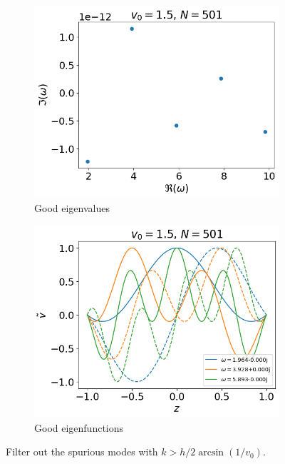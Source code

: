 \begin{figure}[H]
	\centering
	\begin{subfigure}[b]{0.5\linewidth}
		\includegraphics[width=\linewidth]{figures/eigvals-good}
		\caption{Good eigenvalues}
	\end{subfigure}%
	\begin{subfigure}[b]{0.5\linewidth}
		\includegraphics[width=\linewidth]{figures/eigvecs-good}
		\caption{Good eigenfunctions}
	\end{subfigure}
	\caption{Filter out the spurious modes with $k>h/2\arcsin(1/v_0)$.}
	\label{fig:results-filter-k}
\end{figure}

